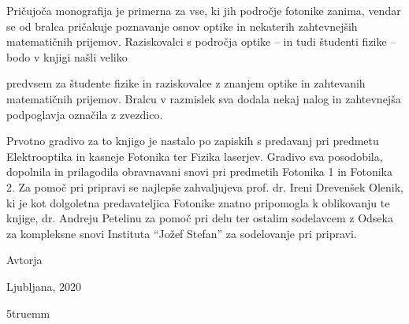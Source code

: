 \documentclass[11pt,fleqn]{book} %
\begin{document}
Pričujoča monografija je primerna za vse, ki jih področje fotonike zanima, 
vendar se od bralca pričakuje poznavanje osnov optike in nekaterih 
zahtevnejših matematičnih prijemov. Raziskovalci s področja optike 
-- in tudi študenti fizike -- bodo v knjigi našli veliko 

predvsem za študente fizike
in raziskovalce z znanjem optike in zahtevanih matematičnih prijemov. 
Bralcu v razmislek 
sva dodala nekaj nalog in zahtevnejša podpoglavja označila z zvezdico.

Prvotno gradivo za to knjigo je nastalo po zapiskih s predavanj pri predmetu 
Elektrooptika in kasneje Fotonika ter Fizika laserjev. Gradivo sva posodobila, dopolnila 
in prilagodila obravnavani snovi pri predmetih Fotonika 1 in Fotonika 2. 
Za pomoč pri pripravi se najlepše zahvaljujeva prof. dr. Ireni Drevenšek Olenik, ki je 
kot dolgoletna predavateljica Fotonike znatno pripomogla k oblikovanju te knjige,
dr. Andreju Petelinu za pomoč pri delu ter ostalim sodelavcem z Odseka za 
kompleksne snovi Instituta ``Jožef Stefan'' za sodelovanje pri pripravi.

\vspace{1em}

Avtorja

\hfill Ljubljana, 2020
\newpage




\thispagestyle{empty}
\vglue5truemm
\end{document}
